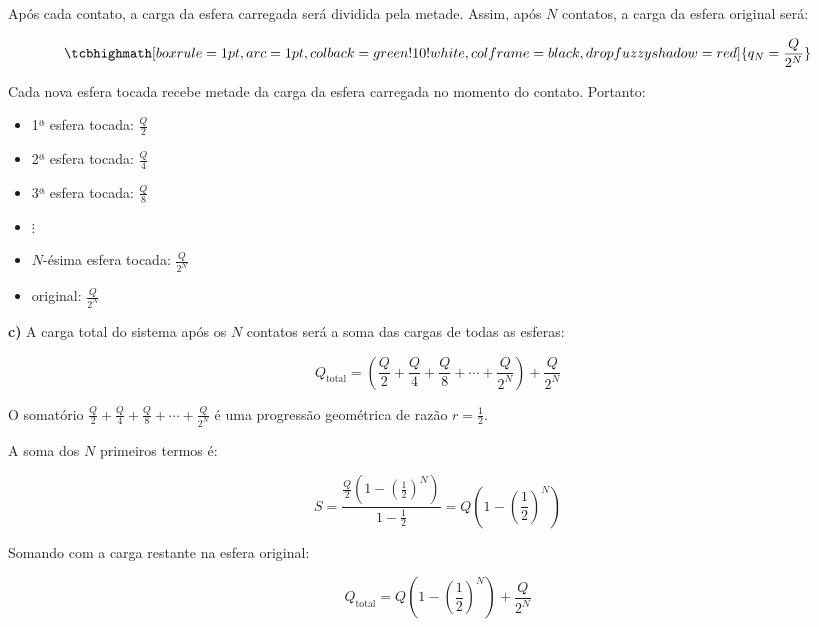 \documentclass[a4paper,12pt]{article}
\begin{document}
Após cada contato, a carga da esfera carregada será dividida pela metade. Assim, após \( N \) contatos, 
a carga da esfera original será:


\begin{equation}
    \tcbhighmath[boxrule=1pt,arc=1pt,colback=green!10!white,colframe=black,
      drop fuzzy shadow=red]{ q_N = \frac{Q}{2^N} }
\end{equation}

Cada nova esfera tocada recebe metade da carga da esfera carregada no momento do contato. Portanto:
\begin{itemize}
    \item 1ª esfera tocada: \( \frac{Q}{2} \)
    \item 2ª esfera tocada: \( \frac{Q}{4} \)
    \item 3ª esfera tocada: \( \frac{Q}{8} \)
    \item \(\vdots\)
    \item \( N \)-ésima esfera tocada: \( \frac{Q}{2^N} \)
    \item original: \( \frac{Q}{2^N} \)
\end{itemize}

\textbf{c)}
A carga total do sistema após os \( N \) contatos será a soma das cargas de todas as esferas:

\begin{equation}
Q_{\text{total}} = \left( \frac{Q}{2} + \frac{Q}{4} + \frac{Q}{8} + \cdots + \frac{Q}{2^N} \right) + \frac{Q}{2^N}
\end{equation}

O somatório \(\frac{Q}{2} + \frac{Q}{4} + \frac{Q}{8} + \cdots + \frac{Q}{2^N}\) é uma progressão geométrica 
de razão \( r = \frac{1}{2} \).

A soma dos \( N \) primeiros termos é:

\begin{equation}
S = \frac{\frac{Q}{2} \left(1 - \left( \frac{1}{2} \right)^N\right)}{1 - \frac{1}{2}}
= Q\left(1 - \left( \frac{1}{2} \right)^N\right)
\end{equation}

Somando com a carga restante na esfera original:

\begin{equation}
Q_{\text{total}} = Q\left(1 - \left( \frac{1}{2} \right)^N\right) + \frac{Q}{2^N}
\end{equation}
\end{document}
